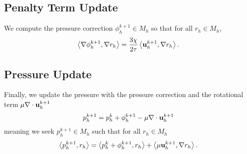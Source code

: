 \documentclass[letterpaper]{erdc}
\begin{document}
%
%
\subsection{Penalty Term Update}
We compute the pressure correction $\phi_h^{k+1}\in M_h$ so that for all $r_h\in M_h$,
\begin{equation}
  \left\langle \nabla\phi_h^{k+1}, \nabla r_h \right\rangle = \frac{3\chi}{2\tau}\left\langle \textbf{u}_h^{k+1}, \nabla r_h \right\rangle.
\end{equation}

%
%
\subsection{Pressure Update}
Finally, we update the pressure with the pressure correction and the rotational term $\mu\nabla\cdot\textbf{u}_h^{k+1}$
\begin{equation}
  p_h^{k+1} = p_h^{k} + \phi_h^{k+1} - \mu\nabla\cdot\textbf{u}_h^{k+1}
\end{equation}
meaning we seek $p_h^{k+1}\in M_h$ such that for all $r_h\in M_h$
\begin{equation}
  \left\langle p_h^{k+1}, r_h \right\rangle = \left\langle p_h^{k} + \phi_h^{k+1}, r_h \right\rangle + \left\langle \mu\textbf{u}_h^{k+1}, \nabla r_h \right\rangle.
\end{equation}
\end{document}
